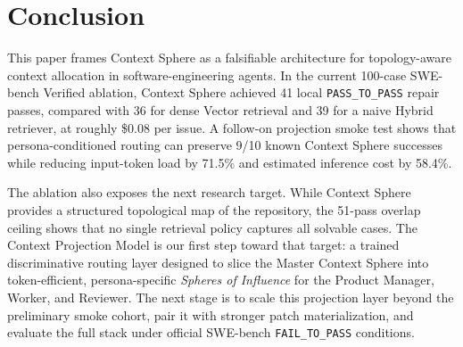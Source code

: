 \section{Conclusion}

This paper frames Context Sphere as a falsifiable architecture for topology-aware context allocation in software-engineering agents. In the current 100-case SWE-bench Verified ablation, Context Sphere achieved 41 local \texttt{PASS\_TO\_PASS} repair passes, compared with 36 for dense Vector retrieval and 39 for a naive Hybrid retriever, at roughly \$0.08 per issue. A follow-on projection smoke test shows that persona-conditioned routing can preserve 9/10 known Context Sphere successes while reducing input-token load by 71.5\% and estimated inference cost by 58.4\%.

The ablation also exposes the next research target. While Context Sphere provides a structured topological map of the repository, the 51-pass overlap ceiling shows that no single retrieval policy captures all solvable cases. The Context Projection Model is our first step toward that target: a trained discriminative routing layer designed to slice the Master Context Sphere into token-efficient, persona-specific \textit{Spheres of Influence} for the Product Manager, Worker, and Reviewer. The next stage is to scale this projection layer beyond the preliminary smoke cohort, pair it with stronger patch materialization, and evaluate the full stack under official SWE-bench \texttt{FAIL\_TO\_PASS} conditions.
